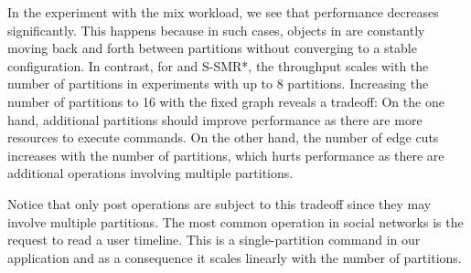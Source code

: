 
In the experiment with the mix workload, we see that \dssmr{} performance decreases significantly.
This happens because in such cases, objects in \dssmr{} are constantly moving back and forth 
between partitions without converging to a stable configuration.
In contrast, for \dynastar and S-SMR*, the throughput scales with 
the number of partitions in experiments with up to 8 partitions. 
Increasing the number of partitions to 16 with the fixed graph reveals a tradeoff:
On the one hand, additional partitions should improve performance as there are more resources to execute commands.
On the other hand, the number of edge cuts increases with the number of partitions, which hurts performance 
as there are additional operations involving multiple partitions.

Notice that only post operations are subject to this tradeoff since they may involve multiple partitions.
The most common operation in social networks is the request to read a user timeline. This is a single-partition
command in our application and as a consequence it scales linearly with the number of partitions.




